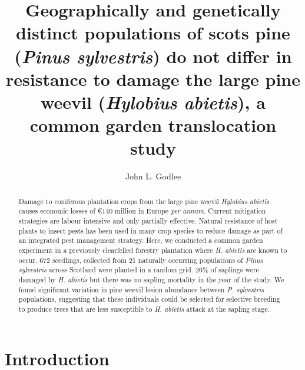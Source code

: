\documentclass[a4paper, 11pt]{article}
\title{Geographically and genetically distinct populations of scots pine (\textit{Pinus sylvestris}) do not differ in resistance to damage the large pine weevil (\textit{Hylobius abietis}), a common garden translocation study}
\author{John L. Godlee}
\begin{document}

\maketitle{}

\begin{abstract}

Damage to coniferous plantation crops from the large pine weevil \textit{Hylobius abietis} causes economic losses of \euro{}140 million in Europe \textit{per annum}. Current mitigation strategies are labour intensive and only partially effective. Natural resistance of host plants to insect pests has been used in many crop species to reduce damage as part of an integrated pest management strategy. Here, we conducted a common garden experiment in a previously clearfelled forestry plantation where \textit{H. abietis} are known to occur. 672 seedlings, collected from 21 naturally occurring populations of \textit{Pinus sylvestris} across Scotland were planted in a random grid. 26\% of saplings were damaged by \textit{H. abietis} but there was no sapling mortality in the year of the study. We found significant variation in pine weevil lesion abundance between \textit{P. sylvestris} populations, suggesting that these individuals could be selected for selective breeding to produce trees that are less susceptible to \textit{H. abietis} attack at the sapling stage.

\end{abstract}

\section*{Introduction}
\end{document}
